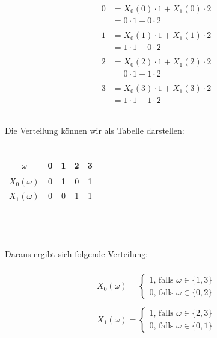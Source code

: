 \documentclass[a4paper]{scrartcl}
\begin{document}
\begin{align*}
	0 &= X_0(0) \cdot 1 + X_1(0) \cdot 2\\
	&= 0 \cdot 1 + 0 \cdot 2\\
	\\
	1 &= X_0(1) \cdot 1 + X_1(1) \cdot 2\\
	&= 1 \cdot 1 + 0 \cdot 2\\
	\\
	2 &= X_0(2) \cdot 1 + X_1(2) \cdot 2\\
	&= 0 \cdot 1 + 1 \cdot 2\\
	\\
	3 &= X_0(3) \cdot 1 + X_1(3) \cdot 2\\
	&= 1 \cdot 1 + 1 \cdot 2\\
	\\
\end{align*}\\
Die Verteilung können wir als Tabelle darstellen:\\\\
\begin{tabular}{|c|c|c|c|c|}
	\hline 
	$\omega$ & 0 & 1 & 2 & 3 \\ 
	\hline 
	$X_0(\omega)$ & 0 & 1 & 0 & 1 \\ 
	\hline 
	$X_1(\omega)$ & 0 & 0 & 1 & 1 \\ 
	\hline 
\end{tabular} \\\\\\
Daraus ergibt sich folgende Verteilung:\\
\\
\begin{align*}
	X_0(\omega) = 
	\begin{cases}
	\text{1, falls } \omega \in \lbrace 1,3 \rbrace\\
	\text{0, falls } \omega \in \lbrace 0,2 \rbrace
	\end{cases}\\\\
	X_1(\omega) = 
	\begin{cases}
	\text{1, falls } \omega \in \lbrace 2,3 \rbrace\\
	\text{0, falls } \omega \in \lbrace 0,1 \rbrace
	\end{cases}
\end{align*}
\newpage
\end{document}
